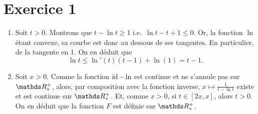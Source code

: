 \section{Exercice 1}

\begin{enumerate}
	\item Soit $t > 0$. Montrons que $t - \ln t \ge 1$\/ i.e.\ $\ln t - t + 1 \le 0$. Or, la fonction $\ln$\/ étant convexe, sa courbe est donc au dessous de ses tangentes.
		En particulier, de la tangente en 1. On en déduit que \[
			\ln t \le \ln'(t) (t-1) + \ln(1) = t - 1
		.\]
	\item Soit $x> 0$. Comme la fonction $\operatorname{id} - \ln$\/ est continue et ne s'annule pas sur $\R^+_*$, alors, par composition avec la fonction inverse, $x\mapsto \frac{1}{t - \ln t}$\/ existe et est continue sur $\R_*^+$. Et, comme $x > 0$, si $t \in [2x, x]$, alors $t > 0$.
		On en déduit que la fonction $F$\/ est définie sur $\R^+_*$.


\end{enumerate}
